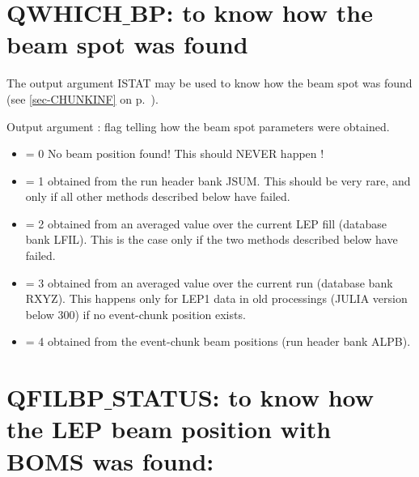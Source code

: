 \par
\section{\label{sec-EBSPOT}QWHICH$\_$BP: to know how the beam spot was found}
\par
{}
\par


     The output argument ISTAT may be used to know how the beam spot was found (see
 \ref{sec-CHUNKINF} on p.~\pageref{sec-CHUNKINF}).

\begin{indentlist}{ 3.50cm}{ 3.75cm}
     Output argument :   flag telling how the beam spot parameters were obtained.

\begin{itemize}
\item                        = 0    No beam position found! This should NEVER happen !

\item                        = 1    obtained from the run header bank  JSUM.
                                    This should be very rare, and only if all other methods described below
                                    have failed.

\item                        = 2    obtained from an averaged value over the current LEP fill (database bank LFIL).
                                    This is the case only if the two methods described below have failed.


\item                        = 3    obtained from an averaged value over the current run  (database bank RXYZ).
                                    This happens  only for LEP1 data in old processings (JULIA version below 300) 
                                    if no event-chunk position exists. 

\item                        = 4     obtained from the event-chunk beam positions (run header bank ALPB).

\end{itemize}
\end{indentlist}


\par
\section{\label{sec-BOMSTAT}QFILBP$\_$STATUS: to know how the LEP beam position with BOMS was found:}
\par
{}
\par


